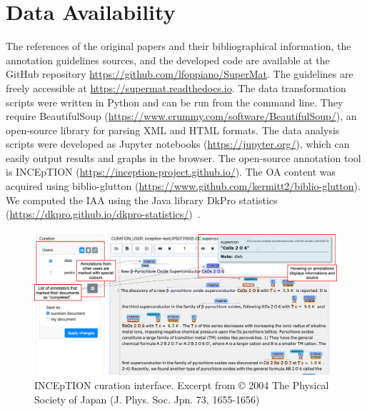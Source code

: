 \section{Data Availability}
\label{sec:code-availability}
The references of the original papers and their bibliographical information, the annotation guidelines sources, and the developed code are available at the GitHub repository \url{https://github.com/lfoppiano/SuperMat}. The guidelines are freely accessible at \url{https://supermat.readthedocs.io}.
The data transformation scripts were written in Python and can be run from the command line. 
They require BeautifulSoup  (\url{https://www.crummy.com/software/BeautifulSoup/}), an open-source library for parsing XML and HTML formats. 
The data analysis scripts were developed as Jupyter notebooks (\url{https://jupyter.org/}), which can easily output results and graphs in the browser. 
The open-source annotation tool is INCEpTION (\url{https://inception-project.github.io/}). 
The OA content was acquired using biblio-glutton (\url{https://www.github.com/kermitt2/biblio-glutton}). 
We computed the IAA using the Java library DkPro statistics (\url{https://dkpro.github.io/dkpro-statistics/})~\cite{Meyer2014DKProAA}.

\begin{figure}[htbp]
    \centering
    \includegraphics[width=\linewidth]{figures/supermat/Fig7.png}
    \caption{INCEpTION curation interface. Excerpt from © 2004 The Physical Society of Japan (J. Phys. Soc. Jpn. 73, 1655-1656)}
    \label{fig:inception-curation-interface}
\end{figure}


